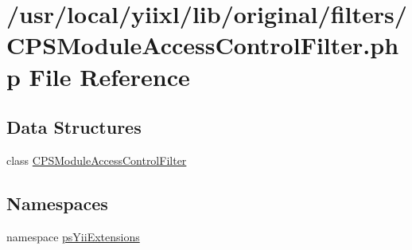 \hypertarget{CPSModuleAccessControlFilter_8php}{
\section{/usr/local/yiixl/lib/original/filters/CPSModuleAccessControlFilter.php File Reference}
\label{CPSModuleAccessControlFilter_8php}
}
\subsection*{Data Structures}
\begin{DoxyCompactItemize}
\item 
class \hyperlink{classCPSModuleAccessControlFilter}{CPSModuleAccessControlFilter}
\end{DoxyCompactItemize}
\subsection*{Namespaces}
\begin{DoxyCompactItemize}
\item 
namespace \hyperlink{namespacepsYiiExtensions}{psYiiExtensions}
\end{DoxyCompactItemize}
